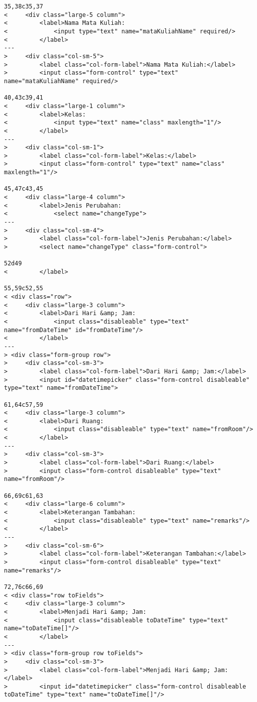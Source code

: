 \begin{lstlisting}
35,38c35,37
<     <div class="large-5 column">
<         <label>Nama Mata Kuliah:
<             <input type="text" name="mataKuliahName" required/>
<         </label>
---
>     <div class="col-sm-5">
>         <label class="col-form-label">Nama Mata Kuliah:</label>
>         <input class="form-control" type="text" name="mataKuliahName" required/>

40,43c39,41
<     <div class="large-1 column">
<         <label>Kelas:
<             <input type="text" name="class" maxlength="1"/>
<         </label>
---
>     <div class="col-sm-1">
>         <label class="col-form-label">Kelas:</label>
>         <input class="form-control" type="text" name="class" maxlength="1"/>

45,47c43,45
<     <div class="large-4 column">
<         <label>Jenis Perubahan:
<             <select name="changeType">
---
>     <div class="col-sm-4">
>         <label class="col-form-label">Jenis Perubahan:</label>
>         <select name="changeType" class="form-control">

52d49
<         </label>

55,59c52,55
< <div class="row">
<     <div class="large-3 column">
<         <label>Dari Hari &amp; Jam:
<             <input class="disableable" type="text" name="fromDateTime" id="fromDateTime"/>
<         </label>
---
> <div class="form-group row">
>     <div class="col-sm-3">
>         <label class="col-form-label">Dari Hari &amp; Jam:</label>
>         <input id="datetimepicker" class="form-control disableable" type="text" name="fromDateTime">

61,64c57,59
<     <div class="large-3 column">
<         <label>Dari Ruang:
<             <input class="disableable" type="text" name="fromRoom"/>
<         </label>
---
>     <div class="col-sm-3">
>         <label class="col-form-label">Dari Ruang:</label>
>         <input class="form-control disableable" type="text" name="fromRoom"/>

66,69c61,63
<     <div class="large-6 column">
<         <label>Keterangan Tambahan:
<             <input class="disableable" type="text" name="remarks"/>
<         </label>
---
>     <div class="col-sm-6">
>         <label class="col-form-label">Keterangan Tambahan:</label>
>         <input class="form-control disableable" type="text" name="remarks"/>

72,76c66,69
< <div class="row toFields">
<     <div class="large-3 column">
<         <label>Menjadi Hari &amp; Jam:
<             <input class="disableable toDateTime" type="text" name="toDateTime[]"/>
<         </label>
---
> <div class="form-group row toFields">
>     <div class="col-sm-3">
>         <label class="col-form-label">Menjadi Hari &amp; Jam:</label>
>         <input id="datetimepicker" class="form-control disableable toDateTime" type="text" name="toDateTime[]"/>


\end{lstlisting}
